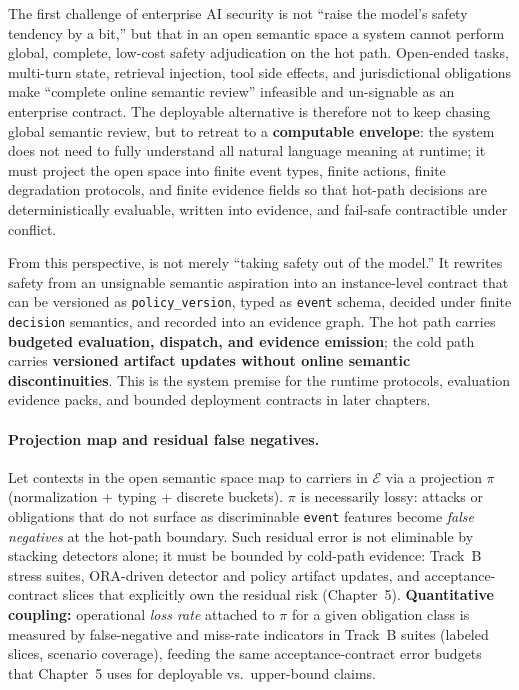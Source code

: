 \documentclass[11pt,a4paper]{report}
\begin{document}
The first challenge of enterprise AI security is not “raise the model’s safety tendency by a bit,” but that in an open semantic space a system cannot perform global, complete, low-cost safety adjudication on the hot path. Open-ended tasks, multi-turn state, retrieval injection, tool side effects, and jurisdictional obligations make “complete online semantic review” infeasible and un-signable as an enterprise contract. The deployable alternative is therefore not to keep chasing global semantic review, but to retreat to a \textbf{computable envelope}: the system does not need to fully understand all natural language meaning at runtime; it must project the open space into finite event types, finite actions, finite degradation protocols, and finite evidence fields so that hot-path decisions are deterministically evaluable, written into evidence, and fail-safe contractible under conflict.

From this perspective, \DecoupledSafety{} is not merely “taking safety out of the model.” It rewrites safety from an unsignable semantic aspiration into an instance-level contract that can be versioned as \texttt{policy\_version}, typed as \texttt{event} schema, decided under finite \texttt{decision} semantics, and recorded into an evidence graph. The hot path carries \textbf{budgeted evaluation, dispatch, and evidence emission}; the cold path carries \textbf{versioned artifact updates without online semantic discontinuities}. This is the system premise for the runtime protocols, evaluation evidence packs, and bounded deployment contracts in later chapters.

\paragraph{Projection map and residual false negatives.} Let contexts in the open semantic space map to carriers in \(\mathcal{E}\) via a projection \(\pi\) (normalization + typing + discrete buckets). \(\pi\) is necessarily lossy: attacks or obligations that do not surface as discriminable \texttt{event} features become \emph{false negatives} at the hot-path boundary. Such residual error is not eliminable by stacking detectors alone; it must be bounded by cold-path evidence: Track~B stress suites, ORA-driven detector and policy artifact updates, and acceptance-contract slices that explicitly own the residual risk (Chapter~5). \textbf{Quantitative coupling:} operational \emph{loss rate} attached to \(\pi\) for a given obligation class is measured by false-negative and miss-rate indicators in Track~B suites (labeled slices, scenario coverage), feeding the same acceptance-contract error budgets that Chapter~5 uses for deployable vs.\ upper-bound claims.
\end{document}
